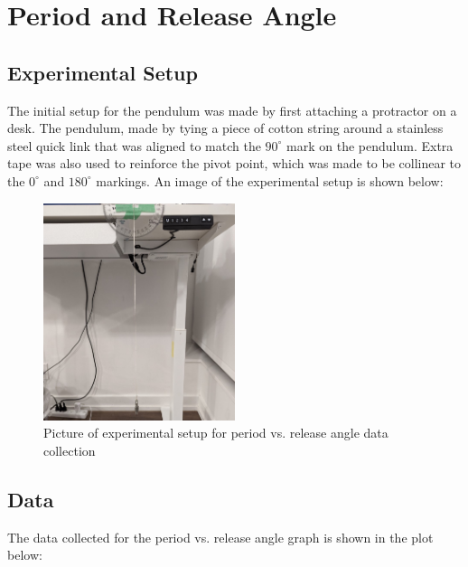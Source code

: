 \documentclass[12pt]{article}
\begin{document}
\newpage

\section{Period and Release Angle}

\subsection{Experimental Setup}
The initial setup for the pendulum was made by first attaching a protractor on a desk. The pendulum, made by tying a piece of cotton string around a stainless steel quick link {\color{blue} that was aligned to match the $90^{\circ}$ mark on the pendulum. Extra tape was also used to reinforce the pivot point, which was made to be collinear to the $0^{\circ}$ and $180^{\circ}$ markings.} An image of the experimental setup is shown below:

\begin{figure}[!hptb]
    \centering
    \includegraphics[width=0.5\textwidth]{../figures/exp_setup1.jpg}
    \caption{\centering Picture of experimental setup for period vs. release angle data collection}
    \label{fig:figure 1}
\end{figure}

\newpage

\subsection{Data} \label{subsec 3.2 Data}
The data collected for the period vs. release angle graph is shown in the plot below:
\end{document}
